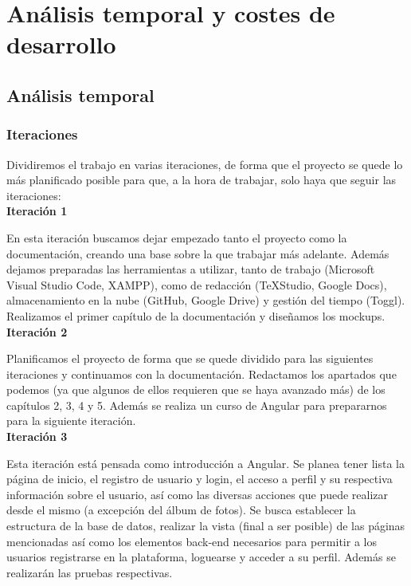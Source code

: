 \chapter{An\'alisis temporal y costes de desarrollo}\label{anatemporal}
\section{An\'alisis temporal}
\subsection{Iteraciones}

Dividiremos el trabajo en varias iteraciones, de forma que el proyecto se quede lo más planificado posible para que, a la hora de trabajar, solo haya que seguir las iteraciones:\\

\textbf{Iteración 1}

En esta iteración buscamos dejar empezado tanto el proyecto como la documentación, creando una base sobre la que trabajar más adelante. Además dejamos preparadas las herramientas a utilizar, tanto de trabajo (Microsoft Visual Studio Code, XAMPP), como de redacción (TeXStudio, Google Docs), almacenamiento en la nube (GitHub, Google Drive) y gestión del tiempo (Toggl). Realizamos el primer capítulo de la documentación y diseñamos los mockups.\\

\textbf{Iteración 2}

Planificamos el proyecto de forma que se quede dividido para las siguientes iteraciones y continuamos con la documentación. Redactamos los apartados que podemos (ya que algunos de ellos requieren que se haya avanzado más) de los capítulos 2, 3, 4 y 5. Además se realiza un curso de Angular \citep{cursoangular} para prepararnos para la siguiente iteración.\\

\textbf{Iteración 3}

Esta iteración está pensada como introducción a Angular. Se planea tener lista la página de inicio, el registro de usuario y login, el acceso a perfil y su respectiva información sobre el usuario, así como las diversas acciones que puede realizar desde el mismo (a excepción del álbum de fotos). Se busca establecer la estructura de la base de datos, realizar la vista (final a ser posible) de las páginas mencionadas así como los elementos back-end necesarios para permitir a los usuarios registrarse en la plataforma, loguearse y acceder a su perfil. Además se realizarán las pruebas respectivas.\\

